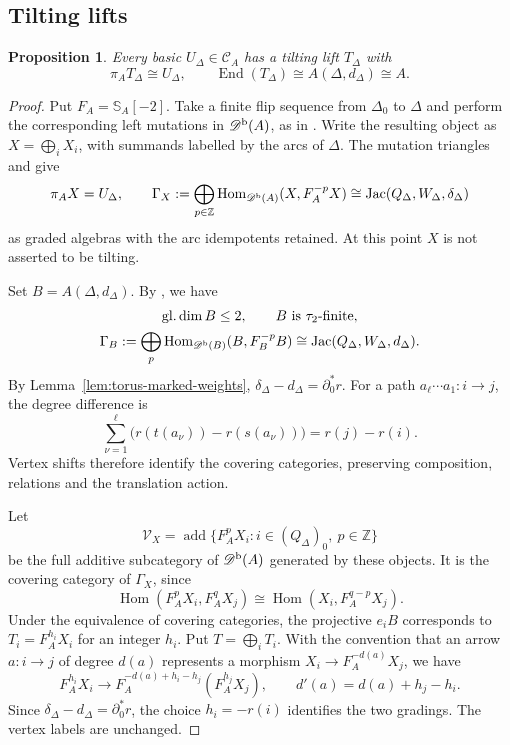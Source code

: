 \documentclass[12pt,a4paper,english,reqno]{amsart}
\theoremstyle{plain}
\newtheorem{prp}[thm]{Proposition}
\theoremstyle{definition}
\numberwithin{equation}{section}
\newcommand{\lemref}[1]{Lemma~\ref{#1}}
\def\de{\delta}
\def\ta{\tau}
\def\Ga{\Gamma}
\def\De{\Delta}
\def\Hom{\operatorname{Hom}}
\def\End{\operatorname{End}}
\def\add{\operatorname{add}}
\def\Db{{\mathcal D}^{\text{\rm b}}}
\def\calC{{\mathcal C}}
\def\bbZ{{\mathbb Z}}
\def\iso{\cong}
\def\Ds{\bigoplus}
\def\Jac{\operatorname{Jac}}
\begin{document}
\subsection{Tilting lifts}
\begin{prp}\label{prop:torus-marked-lift}
Every basic $U_\De\in\calC_A$ has a tilting lift $T_\De$ with
\[
 \pi_A T_\De\iso U_\De,\qquad
 \End(T_\De)\iso A(\De,d_\De)\iso A.
\]
\end{prp}
\begin{proof}
Put $F_A=\mathbb S_A[-2]$. Take a finite flip sequence from $\De_0$ to $\De$ and perform the corresponding left mutations in $\Db(A)$, as in \cite[Definition 3.8]{AGSurface}. Write the resulting object as $X=\Ds_iX_i$, with summands labelled by the arcs of $\De$. The mutation triangles and \cite[Theorem 3.9]{AGSurface} give
\[
 \pi_A X=U_\De,\qquad
 \Ga_X:=\Ds_{p\in\bbZ}\Hom_{\Db(A)}(X,F_A^{-p}X)
 \iso\Jac(Q_\De,W_\De,\de_\De)
\]
as graded algebras with the arc idempotents retained. At this point $X$ is not asserted to be tilting.

Set $B=A(\De,d_\De)$. By \cite[Theorem 3.7]{AGSurface}, we have
\[
\begin{gathered}
 \operatorname{gl.dim}B\le2,\qquad B\text{ is }\ta_2\text{-finite},\\
 \Ga_B:=\Ds_p\Hom_{\Db(B)}(B,F_B^{-p}B)
 \iso\Jac(Q_\De,W_\De,d_\De).
\end{gathered}
\]
By \lemref{lem:torus-marked-weights}, $\de_\De-d_\De=\partial_0^*r$.
For a path $a_\ell\cdots a_1:i\to j$, the degree difference is
\[
 \sum_{\nu=1}^{\ell}\bigl(r(t(a_\nu))-r(s(a_\nu))\bigr)
 =r(j)-r(i).
\]
Vertex shifts therefore identify the covering categories, preserving
composition, relations and the translation action.

Let
\[
 \mathcal V_X=\add\{F_A^pX_i:i\in(Q_\De)_0,\ p\in\bbZ\}
\]
be the full additive subcategory of $\Db(A)$ generated by these objects. It is the covering category of $\Ga_X$, since
\[
 \Hom(F_A^pX_i,F_A^qX_j)
   \iso\Hom(X_i,F_A^{q-p}X_j).
\]
Under the equivalence of covering categories, the projective $e_iB$
corresponds to $T_i=F_A^{h_i}X_i$ for an integer $h_i$. Put $T=\Ds_iT_i$.
With the convention that an arrow $a:i\to j$ of degree $d(a)$ represents
a morphism $X_i\to F_A^{-d(a)}X_j$, we have
\[
 F_A^{h_i}X_i\longrightarrow
 F_A^{-d(a)+h_i-h_j}(F_A^{h_j}X_j),
 \qquad d'(a)=d(a)+h_j-h_i.
\]
Since $\de_\De-d_\De=\partial_0^*r$, the choice $h_i=-r(i)$
identifies the two gradings. The vertex labels are unchanged.


\end{proof}
\end{document}
